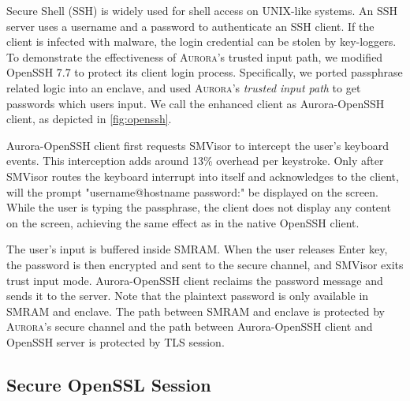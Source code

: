 Secure Shell (SSH) is widely used for shell access on UNIX-like systems. An SSH server uses a username and a password to authenticate an SSH client. If the client is infected with malware, the login credential can be stolen by key-loggers. To demonstrate the effectiveness of \textsc{Aurora}'s trusted input path, we modified OpenSSH 7.7 to protect its client login process. Specifically, we ported passphrase related logic into an enclave, and used \textsc{Aurora}'s \textit{trusted input path} to get passwords which users input. We call the enhanced client as Aurora-OpenSSH client, as depicted in \autoref{fig:openssh}.

Aurora-OpenSSH client first requests SMVisor to intercept the user's  keyboard events. This interception adds around 13\% overhead per keystroke. Only after SMVisor routes the keyboard interrupt into itself and acknowledges to the client, will the prompt \textsf{"username@hostname password:"}  be displayed on the screen. While the user is typing the passphrase, the client does not display any content on the screen, achieving the same effect as in the native OpenSSH client.

The user's input is buffered inside SMRAM. When the user releases \textsf{Enter} key, the password is then encrypted and sent to the secure channel, and SMVisor exits trust input mode.  Aurora-OpenSSH client reclaims the password message and sends it to the server. Note that the plaintext password is only available in SMRAM and enclave. The path between SMRAM and enclave is protected by \textsc{Aurora}'s secure channel and the path between Aurora-OpenSSH client and OpenSSH server is protected by TLS session.
%

\subsection{Secure OpenSSL Session}\label{openssl}


